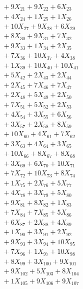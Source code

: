 \documentclass[a4paper,10pt]{article}
\begin{document}
{\begin{align}
&\;  + 9 X_{21} + 9 X_{22} + 6 X_{23} \\[0.3ex]
&\;  + 4 X_{24} + 1 X_{25} + 1 X_{26} \\[0.3ex]
&\;  + 10 X_{27} + 9 X_{28} + 6 X_{29} \\[0.3ex]
&\;  + 8 X_{30} + 9 X_{31} + 7 X_{32} \\[0.3ex]
&\;  + 9 X_{33} + 1 X_{34} + 2 X_{35} \\[0.5ex]\allowbreak
&\;  + 7 X_{36} + 10 X_{37} + 4 X_{38} \\[0.3ex]
&\;  + 1 X_{39} + 10 X_{40} + 10 X_{41} \\[0.3ex]
&\;  + 5 X_{42} + 2 X_{43} + 2 X_{44} \\[0.3ex]
&\;  + 2 X_{45} + 7 X_{46} + 7 X_{47} \\[0.3ex]
&\;  + 2 X_{48} + 5 X_{49} + 2 X_{50} \\[0.3ex]
&\;  + 7 X_{51} + 5 X_{52} + 2 X_{53} \\[0.3ex]
&\;  + 4 X_{54} + 3 X_{55} + 6 X_{56} \\[0.3ex]
&\;  + 3 X_{57} + 2 X_{58} + 8 X_{59} \\[0.3ex]
&\;  + 10 X_{60} + 4 X_{61} + 7 X_{62} \\[0.3ex]
&\;  + 3 X_{63} + 4 X_{64} + 3 X_{65} \\[0.5ex]\allowbreak
&\;  + 10 X_{66} + 8 X_{67} + 8 X_{68} \\[0.3ex]
&\;  + 3 X_{69} + 6 X_{70} + 10 X_{71} \\[0.3ex]
&\;  + 7 X_{72} + 10 X_{73} + 8 X_{74} \\[0.3ex]
&\;  + 1 X_{75} + 2 X_{76} + 5 X_{77} \\[0.3ex]
&\;  + 4 X_{78} + 3 X_{79} + 5 X_{80} \\[0.3ex]
&\;  + 9 X_{81} + 8 X_{82} + 1 X_{83} \\[0.3ex]
&\;  + 7 X_{84} + 7 X_{85} + 5 X_{86} \\[0.3ex]
&\;  + 6 X_{87} + 2 X_{88} + 4 X_{89} \\[0.3ex]
&\;  + 1 X_{90} + 3 X_{91} + 2 X_{92} \\[0.3ex]
&\;  + 9 X_{93} + 3 X_{94} + 10 X_{95} \\[0.5ex]\allowbreak
&\;  + 7 X_{96} + 1 X_{97} + 10 X_{98} \\[0.3ex]
&\;  + 8 X_{99} + 3 X_{100} + 9 X_{101} \\[0.3ex]
&\;  + 9 X_{102} + 5 X_{103} + 8 X_{104} \\[0.3ex]
&\;  + 1 X_{105} + 9 X_{106} + 9 X_{107} \\[0.3ex]

\end{align}}
\end{document}

